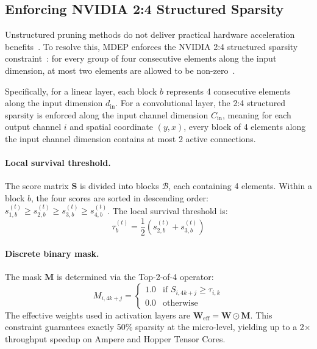 \documentclass[11pt, a4paper]{article}
\begin{document}
\subsection{Enforcing NVIDIA 2:4 Structured Sparsity}\label{subsec:nvidia24}

Unstructured pruning methods do not deliver practical hardware acceleration benefits~\cite{hoefler2021sparsity}. To resolve this, MDEP enforces the NVIDIA 2:4 structured sparsity constraint~\cite{mishra2021accelerating, nvidia2020a100}: for every group of four consecutive elements along the input dimension, at most two elements are allowed to be non-zero~\cite{zhou2021learning, hubara2021accelerated}. 

Specifically, for a linear layer, each block $b$ represents 4 consecutive elements along the input dimension $d_{\text{in}}$. For a convolutional layer, the 2:4 structured sparsity is enforced along the input channel dimension $C_{\text{in}}$, meaning for each output channel $i$ and spatial coordinate $(y, x)$, every block of 4 elements along the input channel dimension contains at most 2 active connections.

\paragraph{Local survival threshold.}
The score matrix $\bm{S}$ is divided into blocks $\mathcal{B}$, each containing 4 elements. Within a block $b$, the four scores are sorted in descending order: $s_{1,b}^{(t)} \ge s_{2,b}^{(t)} \ge s_{3,b}^{(t)} \ge s_{4,b}^{(t)}$. The local survival threshold is:
\begin{equation}\label{eq:tau}
    \tau_b^{(t)} = \frac{1}{2} \left(s_{2,b}^{(t)} + s_{3,b}^{(t)}\right)
\end{equation}

\paragraph{Discrete binary mask.}
The mask $\bm{M}$ is determined via the Top-2-of-4 operator:
\begin{equation}\label{eq:mask}
    M_{i, 4k+j} = \begin{cases}
        1.0 & \text{if } S_{i, 4k+j} \ge \tau_{i,k} \\
        0.0 & \text{otherwise}
    \end{cases}
\end{equation}
The effective weights used in activation layers are $\bm{W}_{\text{eff}} = \bm{W} \odot \bm{M}$. This constraint guarantees exactly 50\% sparsity at the micro-level, yielding up to a 2$\times$ throughput speedup on Ampere and Hopper Tensor Cores.
\end{document}
